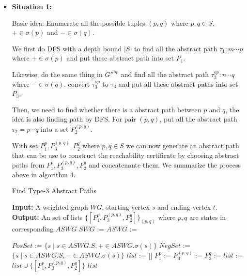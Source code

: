 \documentclass{article}
\begin{document}
\begin{itemize}
\item \textbf{Situation 1:}

Basic idea: Enumerate all the possible tuples $(p, q)$ where $p, q\in S$, $+ \in \sigma(p) $ and $- \in \sigma(q)$.

We first do DFS with a depth bound $|S|$ to find all the abstract path $\tau_1: m\cdots p$ where $+ \in \sigma(p)$ and put these abstract path into set $P_1$.

Likewise, do the same thing in $G''^{op}$ and find all the abstract path $\tau^{op}_3: n\cdots q$ where $-\in \sigma(q)$. convert $\tau^{op}_3$ to $\tau_3$ and put all these abstract paths into set $P_3$.

Then,  we need to find whether there is a abstract path between $p$ and $q$, the idea is also finding path by DFS. For  pair $(p,q)$, put all the abstract path $\tau_2 = p\cdots q$ into a set $P^{(p,q)}_2$.

With set $P_1^p, P^{(p,q)}_3, P_2^q$ where $p,q\in S$ we can now generate an abstract path that can be use to construct the reachability certificate by choosing abstract paths from $P_1^p, P_3^{(p,q)}, P_2^q$ and concatenante them. We summarize the process above in algorithm 4.

\begin{algorithm}
	\caption{Find Type-3 Abstract Paths}
	\begin{algorithmic}
		\State {}
		\State\textbf{Input:} A weighted graph $WG$, starting vertex $s$ and ending vertex $t$.
		\State\textbf{Output:} An set of lists $\{[P_1^p, P_3^{(p,q)}, P_2^q]\}_{(p,q)}$ where $p,q$ are states in corresponding $ASWG$
		\State $SWG$ := 
		\State $ASWG$ := 
		
		\State $PosSet$ := $\{s\mid s\in ASWG.S, +\in ASWG.\sigma(s)\}$
		\State $NegSet$ := $\{s\mid s\in ASWG.S, -\in ASWG.\sigma(s)\}$
		\State $list$ := []
			\State $P_1^p$ := 
				\State $P_3^{(p,q)}$ := 
				\State $P_2^{q}$ := 
				\State $list$ := $list \cup \{[P_1^p, P_3^{(p,q)}, P_2^q]\}$
			\EndFor
		\EndFor
		\State \Return $list$
		\EndFunction
	
		
			

\end{algorithmic}
\end{algorithm}
\end{itemize}
\end{document}
